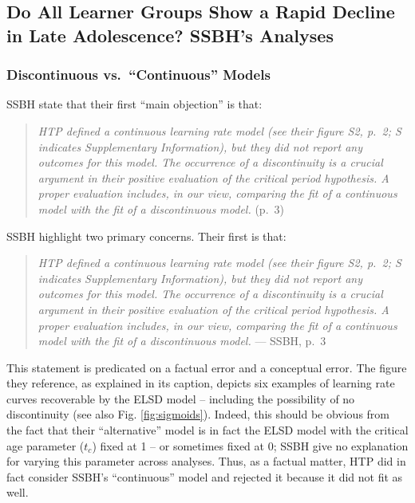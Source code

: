\documentclass[
  english,
  doc,floatsintext]{apa6}
\begin{document}
\hypertarget{do-all-learner-groups-show-a-rapid-decline-in-late-adolescence-ssbhs-analyses}{%
\subsection{Do All Learner Groups Show a Rapid Decline in Late Adolescence? SSBH's Analyses}\label{do-all-learner-groups-show-a-rapid-decline-in-late-adolescence-ssbhs-analyses}}

\hypertarget{discontinuous-vs.-continuous-models}{%
\subsubsection{Discontinuous vs.~``Continuous'' Models}\label{discontinuous-vs.-continuous-models}}

SSBH state that their first ``main objection'' is that:

\begin{quote}
\emph{HTP defined a continuous learning rate model (see their figure S2, p.~2; S indicates Supplementary Information), but they did not report any outcomes for this model. The occurrence of a discontinuity is a crucial argument in their positive evaluation of the critical period hypothesis. A proper evaluation includes, in our view, comparing the fit of a continuous model with the fit of a discontinuous model.} (p.~3)
\end{quote}

SSBH highlight two primary concerns. Their first is that:

\begin{quote}
\emph{HTP defined a continuous learning rate model (see their figure S2, p.~2; S indicates Supplementary Information), but they did not report any outcomes for this model. The occurrence of a discontinuity is a crucial argument in their positive evaluation of the critical period hypothesis. A proper evaluation includes, in our view, comparing the fit of a continuous model with the fit of a discontinuous model.}
\hfill --- SSBH, p.~3
\end{quote}

This statement is predicated on a factual error and a conceptual error. The figure they reference, as explained in its caption, depicts six examples of learning rate curves recoverable by the ELSD model -- including the possibility of no discontinuity (see also Fig. \ref{fig:sigmoids}). Indeed, this should be obvious from the fact that their ``alternative'' model is in fact the ELSD model with the critical age parameter (\(t_c\)) fixed at 1 -- or sometimes fixed at 0; SSBH give no explanation for varying this parameter across analyses. Thus, as a factual matter, HTP did in fact consider SSBH's ``continuous'' model and rejected it because it did not fit as well.
\end{document}

